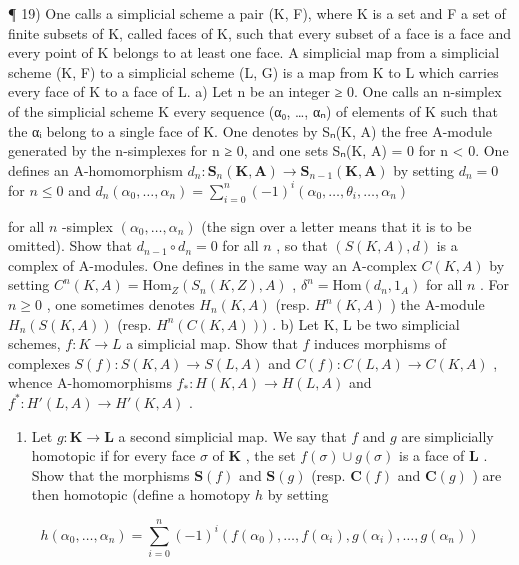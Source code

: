 ¶ 19) One calls a simplicial scheme a pair (K, F), where K is a set and F a set of finite subsets of K, called faces of K, such that every subset of a face is a face and every point of K belongs to at least one face. A simplicial map from a simplicial scheme (K, F) to a simplicial scheme (L, G) is a map from K to L which carries every face of K to a face of L. a) Let n be an integer ≥ 0. One calls an n-simplex of the simplicial scheme K every sequence (α₀, \ldots, αₙ) of elements of K such that the αᵢ belong to a single face of K. One denotes by Sₙ(K, A) the free A-module generated by the n-simplexes for n ≥ 0, and one sets Sₙ(K, A) = 0 for n \textless{} 0. One defines an A-homomorphism \(d_{n}:\mathbf{S}_{n}(\mathbf{K},\mathbf{A})\to \mathbf{S}_{n - 1}(\mathbf{K},\mathbf{A})\) by setting \(d_{n} = 0\) for \(n\leqslant 0\) and \(d_{n}(\alpha_{0},\dots,\alpha_{n}) = \sum_{i = 0}^{n}(-1)^{i}(\alpha_{0},\dots,\theta_{i},\dots,\alpha_{n})\)

for all \(n\) -simplex \((\alpha_0, \ldots, \alpha_n)\) (the sign over a letter means that it is to be omitted). Show that \(d_{n-1} \circ d_n = 0\) for all \(n\) , so that \((S(K, A), d)\) is a complex of A-modules. One defines in the same way an A-complex \(C(K, A)\) by setting \(C^n(K, A) = \text{Hom}_Z(S_n(K, Z), A)\) , \(\delta^n = \text{Hom}(d_n, 1_A)\) for all \(n\) . For \(n \geqslant 0\) , one sometimes denotes \(H_n(K, A)\) (resp. \(H^n(K, A)\) ) the A-module \(H_n(S(K, A))\) (resp. \(H^n(C(K, A)))\) . b) Let K, L be two simplicial schemes, \(f: K \to L\) a simplicial map. Show that \(f\) induces morphisms of complexes \(S(f): S(K, A) \to S(L, A)\) and \(C(f): C(L, A) \to C(K, A)\) , whence A-homomorphisms \(f_*: H(K, A) \to H(L, A)\) and \(f^*: H'(L, A) \to H'(K, A)\) .

\begin{enumerate}
\def\labelenumi{\alph{enumi})}
\setcounter{enumi}{2}
\tightlist
\item
  Let \(g: \mathbf{K} \to \mathbf{L}\) a second simplicial map. We say that \(f\) and \(g\) are simplicially homotopic if for every face \(\sigma\) of \(\mathbf{K}\) , the set \(f(\sigma) \cup g(\sigma)\) is a face of \(\mathbf{L}\) . Show that the morphisms \(\mathbf{S}(f)\) and \(\mathbf{S}(g)\) (resp. \(\mathbf{C}(f)\) and \(\mathbf{C}(g)\) ) are then homotopic (define a homotopy \(h\) by setting
\end{enumerate}

\[
h (\alpha_ {0}, \dots , \alpha_ {n}) = \sum_ {i = 0} ^ {n} (- 1) ^ {i} (f (\alpha_ {0}), \dots , f (\alpha_ {i}), g (\alpha_ {i}), \dots , g (\alpha_ {n}))
\]

